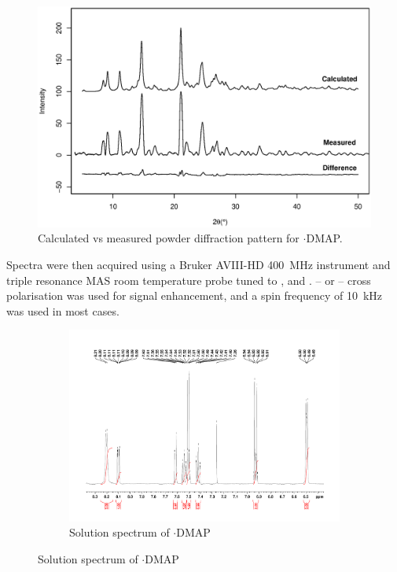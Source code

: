 \begin{refsection}
\begin{figure}
    \centering
    \includegraphics[width=0.9\linewidth]{Figures/ebs-4ome-dmap-pdx.eps}
    \caption{Calculated vs measured powder diffraction pattern for $ \cdot $DMAP.}\label{fig:ebs-4ome-dmap-pdx}
\end{figure}

Spectra were then acquired using a Bruker AVIII-HD 400~MHz instrument and triple resonance MAS room temperature probe tuned to ,  and  .
-- or -- cross polarisation was used for signal enhancement, and a spin frequency of 10~kHz was used in most cases.

\begin{figure}
  \centering
  \begin{subfigure}[t]{\linewidth}
  \centering
  \includegraphics[width=0.9\linewidth]{Figures/ebs-4ome-dmap-sol-1h.pdf}
  \caption{Solution  spectrum of $ \cdot $DMAP}\label{fig:ebs-4ome-dmap-sol-1h}
  \end{subfigure}


\end{figure}
\end{refsection}
